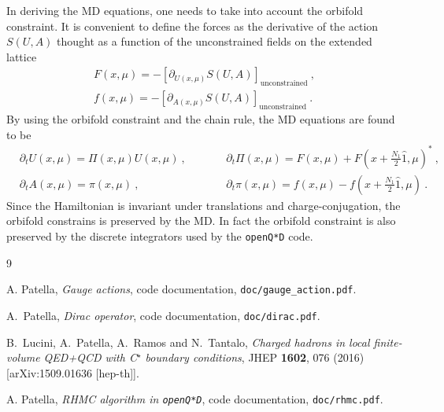 \documentclass[11pt,fleqn]{article}
\begin{document}
In deriving the MD equations, one needs to take into account the orbifold constraint. It is convenient to define the forces as the derivative of the action $S(U,A)$ thought as a function of the unconstrained fields on the extended lattice
\begin{subequations}
   \label{eq:orbi:force}
   \begin{gather}
      F(x,\mu) = - \left[ \partial_{U(x,\mu)} S(U,A) \right]_\text{unconstrained} \ ,
      \label{eq:orbi:forceSU3} \\
      f(x,\mu) = - \left[ \partial_{A(x,\mu)} S(U,A) \right]_\text{unconstrained} \ .
      \label{eq:orbi:forceU1}
   \end{gather}
\end{subequations}
By using the orbifold constraint and the chain rule, the MD equations are found to be
\begin{subequations}
   \label{eq:orbi:MD}
   \begin{alignat}{2}
      &
      \partial_t U(x,\mu) = \Pi(x,\mu) U(x,\mu) \ ,
      &&
      \partial_t \Pi(x,\mu) = F(x,\mu) + F(x+\tfrac{N_1}{2} \hat{1},\mu)^* \ ,
      \\
      & 
      \partial_t A(x,\mu) = \pi(x,\mu) \ ,
      & \qquad &
      \partial_t \pi(x,\mu) = f(x,\mu) - f(x+\tfrac{N_1}{2} \hat{1},\mu) \ .
   \end{alignat}
\end{subequations}
Since the Hamiltonian is invariant under translations and charge-conjugation, the orbifold constrains is preserved by the MD. In fact the orbifold constraint is also preserved by the discrete integrators used by the \texttt{openQ*D} code.




\begin{thebibliography}{9}

  A. Patella,
  \textit{Gauge actions}, code documentation,
  \texttt{doc/gauge\_action.pdf}.

  A.~Patella,
  \textit{Dirac operator}, code documentation,
  \texttt{doc/dirac.pdf}.

  B.~Lucini, A.~Patella, A.~Ramos and N.~Tantalo,
  \textit{Charged hadrons in local finite-volume QED+QCD with C$^{⋆}$ boundary conditions},
  JHEP {\bf 1602}, 076 (2016)
  [arXiv:1509.01636 [hep-th]].

  A. Patella,
  \textit{RHMC algorithm in \texttt{openQ*D}}, code documentation,
  \texttt{doc/rhmc.pdf}.

\end{thebibliography}
\end{document}

